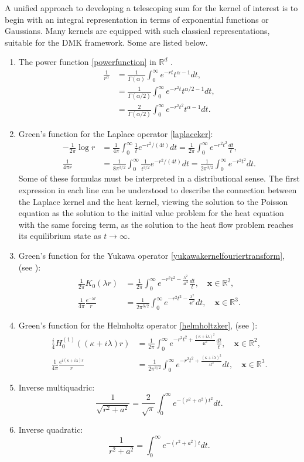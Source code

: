 \documentclass[final,letterpaper]{siamart171218}
\newcommand{\be}{\begin{equation}}
\newcommand{\ee}{\end{equation}}
\newcommand{\ba}{\begin{aligned}}
\newcommand{\ea}{\end{aligned}}
\newcommand{\x}{\boldsymbol{x}}
\newcommand{\acron}{DMK }
\begin{document}
A unified approach to developing a telescoping sum for the kernel of 
interest is to begin with an 
integral representation in terms of exponential functions or
Gaussians. Many kernels are equipped with such classical representations, suitable
for the \acron framework.
Some are listed below.
\begin{enumerate}[label=(\alph*)]
\item The power function \eqref{powerfunction} in $\mathbb{R}^d$
\cite{beylkin2010acha}.
  \be\label{powersog}
  \ba
  \frac{1}{r^\alpha}
  &=\frac{1}{\Gamma\left(\alpha\right)}
  \int_0^\infty e^{-r t} t^{\alpha-1}dt,\\
  &=\frac{1}{\Gamma\left(\alpha/2\right)}
  \int_0^\infty e^{-r^2 t} t^{\alpha/2-1}dt,\\
  &=\frac{2}{\Gamma\left(\alpha/2\right)}
  \int_0^\infty e^{-r^2 t^2} t^{\alpha-1}dt.
  \ea
  \ee
\item Green's function for the Laplace operator \eqref{laplaceker}:
  \be\label{laplacesog}
  \ba
  -\frac{1}{2\pi}\log r&=\frac{1}{4\pi}\int_0^\infty \frac{1}{t}e^{-r^2/(4t)}dt
  = \frac{1}{2\pi}\int_0^\infty e^{-r^2t^2}\frac{dt}{t},\\
  \frac{1}{4\pi r}&=\frac{1}{8\pi^{3/2}}\int_0^\infty \frac{1}{t^{3/2}}e^{-r^2/(4t)}dt
  = \frac{1}{2\pi^{3/2}}\int_0^\infty e^{-r^2t^2}dt.
  \ea
  \ee
Some of these formulas must be interpreted in a distributional sense. The first 
expression in each line can be understood to describe the connection 
between the Laplace kernel and the heat kernel, viewing the 
solution to the Poisson equation as the solution
to the initial value problem for the heat equation with the same forcing term,
as the solution to the heat flow problem reaches its equilibrium state as 
$t \rightarrow \infty$.
\item Green's function for 
  the Yukawa operator \eqref{yukawakernelfouriertransform}, (see
  \cite{bertoglio2012cpc,greengard2018sisc}):
  \be\label{yukawasog}
  \ba
  \frac{1}{2\pi} K_0(\lambda r)
  & = \frac{1}{2\pi}\int_0^\infty e^{-r^2t^2-\frac{\lambda^2}{4t^2}}\frac{dt}{t},
  \quad \x\in\mathbb{R}^2,\\
  \frac{1}{4\pi} \frac{e^{-\lambda r}}{r}
  & = \frac{1}{2\pi^{3/2}}\int_0^\infty e^{-r^2t^2-\frac{\lambda^2}{4t^2}}dt,
  \quad \x\in\mathbb{R}^3.
  \ea
  \ee
\item Green's function for the Helmholtz operator \eqref{helmholtzker}, (see
  \cite{beylkin2009jcp}):
  \be\label{helmholtzsog}
  \ba
  \frac{i}{4} H_0^{(1)}((\kappa+i\lambda) r)
  & = \frac{1}{2\pi}\int_0^\infty e^{-r^2t^2+\frac{(\kappa+i\lambda)^2}{4t^2}}\frac{dt}{t}, \quad \x\in\mathbb{R}^2,\\
  \frac{1}{4\pi} \frac{e^{i(\kappa+i\lambda) r}}{r}
  & = \frac{1}{2\pi^{3/2}}\int_0^\infty e^{-r^2t^2+\frac{(\kappa+i\lambda)^2}{4t^2}}dt, \quad \x\in\mathbb{R}^3.
  \ea
  \ee

\item Inverse multiquadric:
  \be\label{reglarizedkernelsog}
  \frac{1}{\sqrt{r^2+a^2}}
  = \frac{2}{\sqrt{\pi}}\int_0^\infty e^{-(r^2+a^2)t^2}dt.
  \ee
\item Inverse quadratic:
  \be\label{invquadratic}
  \frac{1}{r^2+a^2}=\int_0^\infty e^{-(r^2+a^2)t}dt.
  \ee
\end{enumerate}
\end{document}

